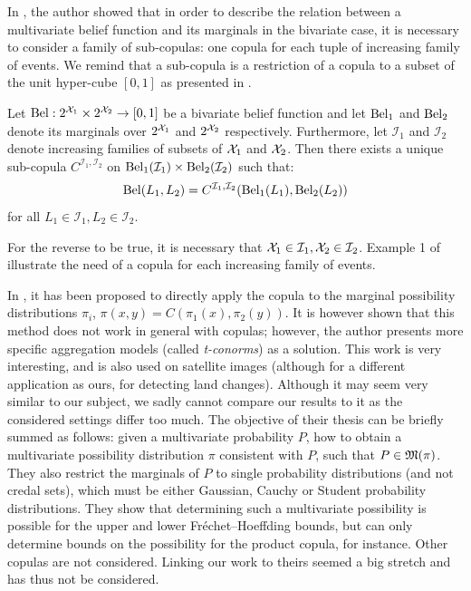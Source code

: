 In \cite{schmelzer_joint_2015}, the author showed that in order to describe the relation between a multivariate belief function and its marginals in the bivariate case, it is necessary to consider a family of sub-copulas: one copula for each tuple of increasing family of events. We remind that a sub-copula is a restriction of a copula to a subset of the unit hyper-cube $[0,1]$ as presented in .

\begin{theorem}\label{theorem:sklarbelief}
    Let $\mathrm{Bel} :2^{\mathcal{X}_1}\times2^{\mathcal{X}_2}\rightarrow[0,1]$ be a bivariate belief function and let $\mathrm{Bel}_1$ and $\mathrm{Bel}_2$ denote its marginals over $2^{\mathcal{X}_1}$ and $2^{\mathcal{X}_2}$ respectively. Furthermore, let $\mathcal{I}_1$ and $\mathcal{I}_2$ denote increasing families of subsets of $\mathcal{X}_1$ and $\mathcal{X}_2$. Then there exists a unique sub-copula $C^{\mathcal{I}_1,\mathcal{I}_2}$ on  $\mathrm{Bel}_1(\mathcal{I}_1)\times \mathrm{Bel}_2(\mathcal{I}_2)$ such that:
    \begin{eqnarray}
        \mathrm{Bel} (L_1, L_2) = C^{\mathcal{I}_1,\mathcal{I}_2}(\mathrm{Bel}_1(L_1), \mathrm{Bel}_2(L_2))
    \end{eqnarray}
    for all $L_1\in\mathcal{I}_1,L_2\in\mathcal{I}_2$.
\end{theorem}
For the reverse to be true, it is necessary that $\mathcal{X}_1\in\mathcal{I}_1, \mathcal{X}_2\in\mathcal{I}_2$. Example 1 of \cite{schmelzer_joint_2015} illustrate the need of a copula for each increasing family of events.

\begin{remark}
    In \cite{lesniewska-choquet_specialite_2020}, it has been proposed to directly apply the copula to the marginal possibility distributions $\pi_i$, \ie $\pi(x,y)=C(\pi_1(x), \pi_2(y))$. It is however shown that this method does not work in general with copulas; however, the author presents more specific aggregation models (called \textit{t-conorms}) as a solution. This work is very interesting, and is also used on satellite images (although for a different application as ours, \ie for detecting land changes). Although it may seem very similar to our subject, we sadly cannot compare our results to it as the considered settings differ too much. The objective of their thesis can be briefly summed as follows: given a multivariate probability $P$, how to obtain a multivariate possibility distribution $\pi$ consistent with $P$, \ie such that $P\in\mathfrak{M}(\pi)$. They also restrict the marginals of $P$ to single probability distributions (and not credal sets), which must be either Gaussian, Cauchy or Student probability distributions. They show that determining such a multivariate possibility is possible for the upper and lower Fréchet–Hoeffding bounds, but can only determine bounds on the possibility for the product copula, for instance. Other copulas are not considered. Linking our work to theirs seemed a big stretch and has thus not be considered. 
\end{remark}

